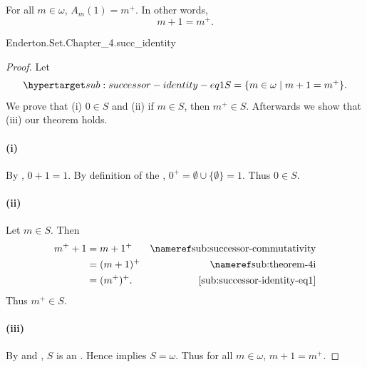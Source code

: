 \documentclass{report}
\begin{document}
\subsection{}%

  \begin{lemma}
    For all $m \in \omega$, $A_m(1) = m^+$.
    In other words, $$m + 1 = m^+.$$
  \end{lemma}

    {Enderton.Set.Chapter\_4.succ\_identity}


  \begin{proof}

    Let
      \begin{equation}
        \hyperlabel{sub:successor-identity-eq1}
        S = \{m \in \omega \mid m + 1 = m^+\}.
      \end{equation}
    We prove that (i) $0 \in S$ and (ii) if $m \in S$, then $m^+ \in S$.
    Afterwards we show that (iii) our theorem holds.

    \paragraph{(i)}%

      By , $0 + 1 = 1$.
      By definition of the ,
        $0^+ = \emptyset \cup \{\emptyset\} = 1$.
      Thus $0 \in S$.

    \paragraph{(ii)}%

      Let $m \in S$.
      Then
        \begin{align*}
          m^+ + 1
            & = m + 1^+ & \textref{sub:successor-commutativity} \\
            & = (m + 1)^+ & \textref{sub:theorem-4i} \\
            & = (m^+)^+. & \eqref{sub:successor-identity-eq1}
        \end{align*}
      Thus $m^+ \in S$.

    \paragraph{(iii)}%

      By  and
        , $S$ is an
        .
      Hence  implies $S = \omega$.
      Thus for all $m \in \omega$, $m + 1 = m^+$.

  \end{proof}
\end{document}
